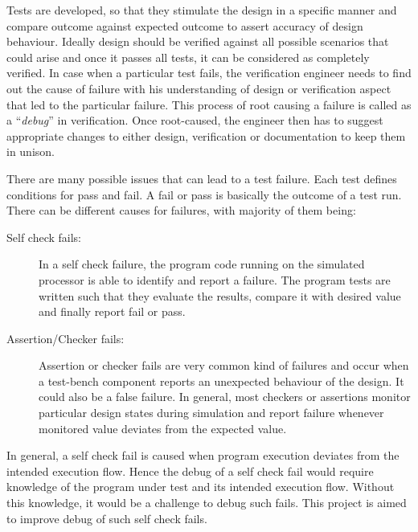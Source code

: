 Tests are developed, so that they stimulate the design in a specific manner and compare outcome against expected outcome to assert accuracy of design behaviour. Ideally design should be verified against all possible scenarios that could arise and once it passes all tests, it can be considered as completely verified. In case when a particular test fails, the verification engineer needs to find out the cause of failure with his understanding of design or verification aspect that led to the particular failure. This process of root causing a failure is called as a ``{\it debug}'' in verification. Once root-caused, the engineer then has to suggest appropriate changes to either design, verification or documentation to keep them in unison. 

There are many possible issues that can lead to a test failure. Each test defines conditions for pass and fail. A fail or pass is basically the outcome of a test run. There can be different causes for failures, with majority of them being:

\begin{description}
	\item[Self check fails:] In a self check failure, the program code running on the simulated processor is able to identify and report a failure. The program tests are written such that they evaluate the results, compare it with desired value and finally report fail or pass. 
	\item[Assertion/Checker fails:] Assertion or checker fails are very common kind of failures and occur when a test-bench component reports an unexpected behaviour of the design. It could also be a false failure. In general, most checkers or assertions monitor particular design states during simulation and report failure whenever monitored value deviates from the expected value. 
\end{description}

In general, a self check fail is caused when program execution deviates from the intended execution flow. Hence the debug of a self check fail would require knowledge of the program under test and its intended execution flow. Without this knowledge, it would be a challenge to debug such fails. This project is aimed to improve debug of such self check fails.

%
%
%


